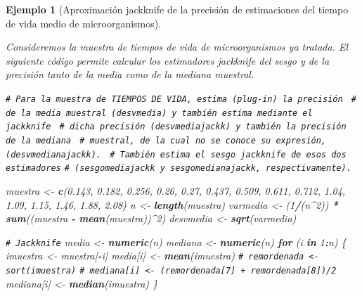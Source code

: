 \documentclass[
]{book}
\newenvironment{Shaded}{\begin{snugshade}}{\end{snugshade}}
\newcommand{\CommentTok}[1]{\textcolor[rgb]{0.56,0.35,0.01}{\textit{#1}}}
\newcommand{\ControlFlowTok}[1]{\textcolor[rgb]{0.13,0.29,0.53}{\textbf{#1}}}
\newcommand{\DecValTok}[1]{\textcolor[rgb]{0.00,0.00,0.81}{#1}}
\newcommand{\FloatTok}[1]{\textcolor[rgb]{0.00,0.00,0.81}{#1}}
\newcommand{\FunctionTok}[1]{\textcolor[rgb]{0.13,0.29,0.53}{\textbf{#1}}}
\newcommand{\NormalTok}[1]{#1}
\newcommand{\OtherTok}[1]{\textcolor[rgb]{0.56,0.35,0.01}{#1}}
\newcommand{\SpecialCharTok}[1]{\textcolor[rgb]{0.81,0.36,0.00}{\textbf{#1}}}
\theoremstyle{break}
\newtheorem{example}{Ejemplo}[chapter]
\theoremstyle{nonumberplain}
\renewcommand{\CommentTok}[1]{\textcolor[rgb]{0.41,0.41,0.41}{\texttt{#1}}}
\begin{document}
\begin{example}[Aproximación jackknife de la precisión de estimaciones del tiempo de vida medio de microorganismos]
\protect\hypertarget{exm:estimacion-jack-precision}{}\label{exm:estimacion-jack-precision} \vspace{0.5cm}

Consideremos la muestra de tiempos de vida de microorganismos ya
tratada. El siguiente código permite calcular los
estimadores jackknife del sesgo y de la precisión tanto de la media como
de la mediana muestral.

\begin{Shaded}
\begin{Highlighting}[]
\CommentTok{\# Para la muestra de TIEMPOS DE VIDA, estima (plug{-}in) la precisión }
\CommentTok{\# de la media muestral (desvmedia) y también estima mediante el jackknife }
\CommentTok{\# dicha precisión (desvmediajackk) y también la precisión de la mediana }
\CommentTok{\# muestral, de la cual no se conoce su expresión, (desvmedianajackk). }
\CommentTok{\# También estima el sesgo jackknife de esos dos estimadores}
\CommentTok{\# (sesgomediajackk y sesgomedianajackk, respectivamente).}

\NormalTok{muestra }\OtherTok{\textless{}{-}} \FunctionTok{c}\NormalTok{(}\FloatTok{0.143}\NormalTok{, }\FloatTok{0.182}\NormalTok{, }\FloatTok{0.256}\NormalTok{, }\FloatTok{0.26}\NormalTok{, }\FloatTok{0.27}\NormalTok{, }\FloatTok{0.437}\NormalTok{, }\FloatTok{0.509}\NormalTok{, }
    \FloatTok{0.611}\NormalTok{, }\FloatTok{0.712}\NormalTok{, }\FloatTok{1.04}\NormalTok{, }\FloatTok{1.09}\NormalTok{, }\FloatTok{1.15}\NormalTok{, }\FloatTok{1.46}\NormalTok{, }\FloatTok{1.88}\NormalTok{, }\FloatTok{2.08}\NormalTok{)}
\NormalTok{n }\OtherTok{\textless{}{-}} \FunctionTok{length}\NormalTok{(muestra)}
\NormalTok{varmedia }\OtherTok{\textless{}{-}}\NormalTok{ (}\DecValTok{1}\SpecialCharTok{/}\NormalTok{(n}\SpecialCharTok{\^{}}\DecValTok{2}\NormalTok{)) }\SpecialCharTok{*} \FunctionTok{sum}\NormalTok{((muestra }\SpecialCharTok{{-}} \FunctionTok{mean}\NormalTok{(muestra))}\SpecialCharTok{\^{}}\DecValTok{2}\NormalTok{)}
\NormalTok{desvmedia }\OtherTok{\textless{}{-}} \FunctionTok{sqrt}\NormalTok{(varmedia)}

\CommentTok{\# Jackknife}
\NormalTok{media }\OtherTok{\textless{}{-}} \FunctionTok{numeric}\NormalTok{(n)}
\NormalTok{mediana }\OtherTok{\textless{}{-}} \FunctionTok{numeric}\NormalTok{(n)}
\ControlFlowTok{for}\NormalTok{ (i }\ControlFlowTok{in} \DecValTok{1}\SpecialCharTok{:}\NormalTok{n) \{}
\NormalTok{    imuestra }\OtherTok{\textless{}{-}}\NormalTok{ muestra[}\SpecialCharTok{{-}}\NormalTok{i]}
\NormalTok{    media[i] }\OtherTok{\textless{}{-}} \FunctionTok{mean}\NormalTok{(imuestra)}
    \CommentTok{\# remordenada \textless{}{-} sort(imuestra)}
    \CommentTok{\# mediana[i] \textless{}{-} (remordenada[7] + remordenada[8])/2}
\NormalTok{    mediana[i] }\OtherTok{\textless{}{-}} \FunctionTok{median}\NormalTok{(imuestra)}
\NormalTok{\}}


\end{Highlighting}
\end{Shaded}
\end{example}
\end{document}
